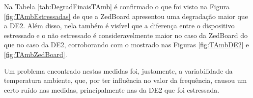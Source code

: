 



Na Tabela \ref{tab:DegradFinaisTAmb} é confirmado o que foi visto na Figura \ref{fig:TAmbEstressadas} de que a ZedBoard apresentou uma degradação maior que a DE2. Além disso, nela também é visível que a diferença entre o dispositivo estressado e o não estressado é consideravelmente maior no caso da ZedBoard do que no caso da DE2, corroborando com o mostrado nas Figuras \ref{fig:TAmbDE2} e \ref{fig:TAmbZedBoard}.

Um problema encontrado nestas medidas foi, justamente, a variabilidade da temperatura ambiente, que, por ter influência no valor da frequência, causou um certo ruído nas medidas, principalmente nas da DE2 que foi estressada.